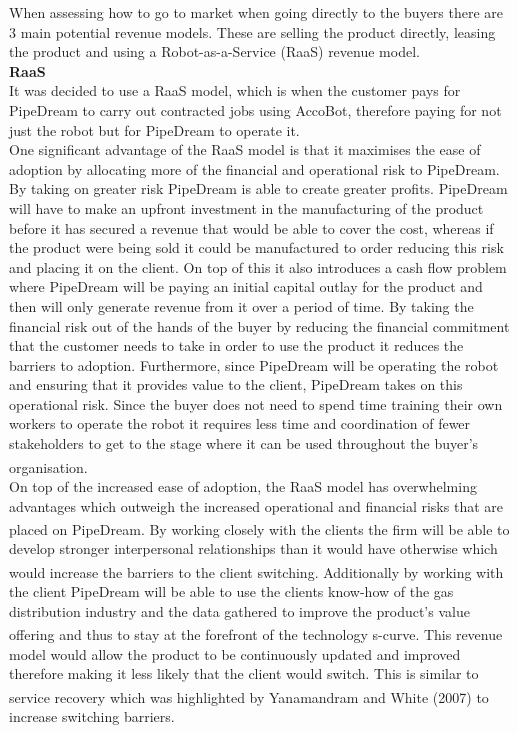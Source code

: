 \documentclass[11pt]{article}		%
\newcommand{\supercite}[1]{\textsuperscript{\cite{#1}}}		%
\begin{document}
            When assessing how to go to market when going directly to the buyers there are 3 main potential revenue models. These are selling the product directly, leasing the product and using a Robot-as-a-Service (RaaS) revenue model.
            \\
            \textbf{RaaS}
            \\
            It was decided to use a RaaS model, which is when the customer pays for PipeDream to carry out contracted jobs using AccoBot, therefore paying for not just the robot but for PipeDream to operate it. 
            \\
            One significant advantage of the RaaS model is that it maximises the ease of adoption by allocating more of the financial and operational risk to PipeDream. By taking on greater risk PipeDream is able to create greater profits. PipeDream will have to make an upfront investment in the manufacturing of the product before it has secured a revenue that would be able to cover the cost, whereas if the product were being sold it could be manufactured to order reducing this risk and placing it on the client. On top of this it also introduces a cash flow problem where PipeDream will be paying an initial capital outlay for the product and then will only generate revenue from it over a period of time.  By taking the financial risk out of the hands of the buyer by reducing the financial commitment that the customer needs to take in order to use the product it reduces the barriers to adoption. Furthermore, since PipeDream will be operating the robot and ensuring that it provides value to the client, PipeDream takes on this operational risk. Since the buyer does not need to spend time training their own workers to operate the robot it requires less time and coordination of fewer stakeholders to get to the stage where it can be used throughout the buyer’s organisation.\supercite{RaaS}
            \\
            On top of the increased ease of adoption, the RaaS model has overwhelming advantages which outweigh the increased operational and financial risks that are placed on PipeDream. \supercite{RaaS}By working closely with the clients the firm will be able to develop stronger interpersonal relationships than it would have otherwise which would increase the barriers to the client switching. \supercite{B2Brelations} Additionally by working with the client PipeDream will be able to use the clients know-how of the gas distribution industry and the data gathered to improve the product’s value offering and thus to stay at the forefront of the technology s-curve.\supercite{Barney} This revenue model would allow the product to be continuously updated and improved therefore making it less likely that the client would switch. This is similar to service recovery which was highlighted by Yanamandram and White (2007) \supercite{customers} to increase switching barriers.
\end{document}
